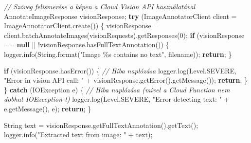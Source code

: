 \documentclass[
]{article}
\newenvironment{Shaded}{}{}
\newcommand{\BuiltInTok}[1]{\textcolor[rgb]{0.00,0.50,0.00}{#1}}
\newcommand{\CommentTok}[1]{\textcolor[rgb]{0.38,0.63,0.69}{\textit{#1}}}
\newcommand{\ControlFlowTok}[1]{\textcolor[rgb]{0.00,0.44,0.13}{\textbf{#1}}}
\newcommand{\DecValTok}[1]{\textcolor[rgb]{0.25,0.63,0.44}{#1}}
\newcommand{\FunctionTok}[1]{\textcolor[rgb]{0.02,0.16,0.49}{#1}}
\newcommand{\KeywordTok}[1]{\textcolor[rgb]{0.00,0.44,0.13}{\textbf{#1}}}
\newcommand{\NormalTok}[1]{#1}
\newcommand{\OperatorTok}[1]{\textcolor[rgb]{0.40,0.40,0.40}{#1}}
\newcommand{\SpecialCharTok}[1]{\textcolor[rgb]{0.25,0.44,0.63}{#1}}
\newcommand{\StringTok}[1]{\textcolor[rgb]{0.25,0.44,0.63}{#1}}
\begin{document}
\begin{Shaded}
\begin{Highlighting}[]
    \CommentTok{// Szöveg felismerése a képen a Cloud Vision API használatával}
\NormalTok{    AnnotateImageResponse visionResponse}\OperatorTok{;}
    \ControlFlowTok{try} \OperatorTok{(}\NormalTok{ImageAnnotatorClient client }\OperatorTok{=}\NormalTok{ ImageAnnotatorClient}\OperatorTok{.}\FunctionTok{create}\OperatorTok{())} \OperatorTok{\{}
\NormalTok{      visionResponse }\OperatorTok{=}\NormalTok{ client}\OperatorTok{.}\FunctionTok{batchAnnotateImages}\OperatorTok{(}\NormalTok{visionRequests}\OperatorTok{).}\FunctionTok{getResponses}\OperatorTok{(}\DecValTok{0}\OperatorTok{);}
      \ControlFlowTok{if} \OperatorTok{(}\NormalTok{visionResponse }\OperatorTok{==} \KeywordTok{null} \OperatorTok{||} \OperatorTok{!}\NormalTok{visionResponse}\OperatorTok{.}\FunctionTok{hasFullTextAnnotation}\OperatorTok{())} \OperatorTok{\{}
\NormalTok{        logger}\OperatorTok{.}\FunctionTok{info}\OperatorTok{(}\BuiltInTok{String}\OperatorTok{.}\FunctionTok{format}\OperatorTok{(}\StringTok{"Image }\SpecialCharTok{\%s}\StringTok{ contains no text"}\OperatorTok{,}\NormalTok{ filename}\OperatorTok{));}
        \ControlFlowTok{return}\OperatorTok{;}
      \OperatorTok{\}}

      \ControlFlowTok{if} \OperatorTok{(}\NormalTok{visionResponse}\OperatorTok{.}\FunctionTok{hasError}\OperatorTok{())} \OperatorTok{\{}
        \CommentTok{// Hiba naplózása}
\NormalTok{        logger}\OperatorTok{.}\FunctionTok{log}\OperatorTok{(}\BuiltInTok{Level}\OperatorTok{.}\FunctionTok{SEVERE}\OperatorTok{,} \StringTok{"Error in vision API call: "} \OperatorTok{+}
\NormalTok{            visionResponse}\OperatorTok{.}\FunctionTok{getError}\OperatorTok{().}\FunctionTok{getMessage}\OperatorTok{());}
        \ControlFlowTok{return}\OperatorTok{;}
      \OperatorTok{\}}
    \OperatorTok{\}} \ControlFlowTok{catch} \OperatorTok{(}\BuiltInTok{IOException}\NormalTok{ e}\OperatorTok{)} \OperatorTok{\{}
      \CommentTok{// Hiba naplózása (mivel a Cloud Function nem dobhat IOException{-}t)}
\NormalTok{      logger}\OperatorTok{.}\FunctionTok{log}\OperatorTok{(}\BuiltInTok{Level}\OperatorTok{.}\FunctionTok{SEVERE}\OperatorTok{,} \StringTok{"Error detecting text: "} \OperatorTok{+}\NormalTok{ e}\OperatorTok{.}\FunctionTok{getMessage}\OperatorTok{(),}\NormalTok{ e}\OperatorTok{);}
      \ControlFlowTok{return}\OperatorTok{;}
    \OperatorTok{\}}

    \BuiltInTok{String}\NormalTok{ text }\OperatorTok{=}\NormalTok{ visionResponse}\OperatorTok{.}\FunctionTok{getFullTextAnnotation}\OperatorTok{().}\FunctionTok{getText}\OperatorTok{();}
\NormalTok{    logger}\OperatorTok{.}\FunctionTok{info}\OperatorTok{(}\StringTok{"Extracted text from image: "} \OperatorTok{+}\NormalTok{ text}\OperatorTok{);}


\end{Highlighting}
\end{Shaded}
\end{document}
